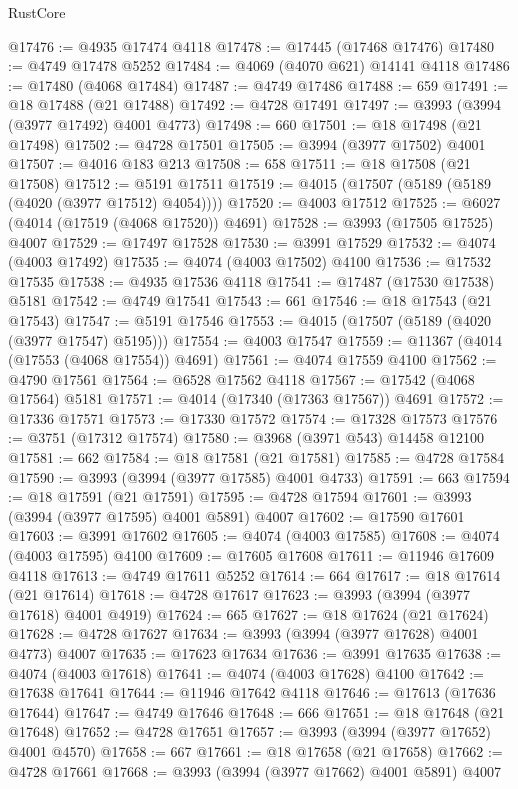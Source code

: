 \begin{lexlean}{RustCore}
\begin{coremodule}
@17476 := @4935 @17474 @4118
@17478 := @17445 (@17468 @17476)
@17480 := @4749 @17478 @5252
@17484 := @4069 (@4070 @621) @14141 @4118
@17486 := @17480 (@4068 @17484)
@17487 := @4749 @17486
@17488 := 659
@17491 := @18 @17488 (@21 @17488)
@17492 := @4728 @17491
@17497 := @3993 (@3994 (@3977 @17492) @4001 @4773)
@17498 := 660
@17501 := @18 @17498 (@21 @17498)
@17502 := @4728 @17501
@17505 := @3994 (@3977 @17502) @4001
@17507 := @4016 @183 @213
@17508 := 658
@17511 := @18 @17508 (@21 @17508)
@17512 := @5191 @17511
@17519 := @4015 (@17507 (@5189 (@5189 (@4020 (@3977 @17512) @4054))))
@17520 := @4003 @17512
@17525 := @6027 (@4014 (@17519 (@4068 @17520)) @4691)
@17528 := @3993 (@17505 @17525) @4007
@17529 := @17497 @17528
@17530 := @3991 @17529
@17532 := @4074 (@4003 @17492)
@17535 := @4074 (@4003 @17502) @4100
@17536 := @17532 @17535
@17538 := @4935 @17536 @4118
@17541 := @17487 (@17530 @17538) @5181
@17542 := @4749 @17541
@17543 := 661
@17546 := @18 @17543 (@21 @17543)
@17547 := @5191 @17546
@17553 := @4015 (@17507 (@5189 (@4020 (@3977 @17547) @5195)))
@17554 := @4003 @17547
@17559 := @11367 (@4014 (@17553 (@4068 @17554)) @4691)
@17561 := @4074 @17559 @4100
@17562 := @4790 @17561
@17564 := @6528 @17562 @4118
@17567 := @17542 (@4068 @17564) @5181
@17571 := @4014 (@17340 (@17363 @17567)) @4691
@17572 := @17336 @17571
@17573 := @17330 @17572
@17574 := @17328 @17573
@17576 := @3751 (@17312 @17574)
@17580 := @3968 (@3971 @543) @14458 @12100
@17581 := 662
@17584 := @18 @17581 (@21 @17581)
@17585 := @4728 @17584
@17590 := @3993 (@3994 (@3977 @17585) @4001 @4733)
@17591 := 663
@17594 := @18 @17591 (@21 @17591)
@17595 := @4728 @17594
@17601 := @3993 (@3994 (@3977 @17595) @4001 @5891) @4007
@17602 := @17590 @17601
@17603 := @3991 @17602
@17605 := @4074 (@4003 @17585)
@17608 := @4074 (@4003 @17595) @4100
@17609 := @17605 @17608
@17611 := @11946 @17609 @4118
@17613 := @4749 @17611 @5252
@17614 := 664
@17617 := @18 @17614 (@21 @17614)
@17618 := @4728 @17617
@17623 := @3993 (@3994 (@3977 @17618) @4001 @4919)
@17624 := 665
@17627 := @18 @17624 (@21 @17624)
@17628 := @4728 @17627
@17634 := @3993 (@3994 (@3977 @17628) @4001 @4773) @4007
@17635 := @17623 @17634
@17636 := @3991 @17635
@17638 := @4074 (@4003 @17618)
@17641 := @4074 (@4003 @17628) @4100
@17642 := @17638 @17641
@17644 := @11946 @17642 @4118
@17646 := @17613 (@17636 @17644)
@17647 := @4749 @17646
@17648 := 666
@17651 := @18 @17648 (@21 @17648)
@17652 := @4728 @17651
@17657 := @3993 (@3994 (@3977 @17652) @4001 @4570)
@17658 := 667
@17661 := @18 @17658 (@21 @17658)
@17662 := @4728 @17661
@17668 := @3993 (@3994 (@3977 @17662) @4001 @5891) @4007

\end{coremodule}
\end{lexlean}
